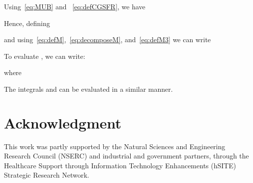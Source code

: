 \documentclass[10pt,twocolumn,twoside]{IEEEtran}
\newcommand{\corcol}[1]{\textcolor{CorCol}{#1}}
\begin{document}
\corcol{Using~\eqref{eq:MUB} and ~\eqref{eq:defCGSFR}, we have

Hence, defining

and using~\eqref{eq:defM},~\eqref{eq:decomposeM}, and~\eqref{eq:defM3} we can write

To evaluate , we can write:

where

The integrals  and  can be evaluated in a similar manner.} 



\section*{Acknowledgment}

This work was partly supported by the Natural Sciences and Engineering Research Council (NSERC) and industrial and government partners, through the Healthcare Support through Information Technology Enhancements (hSITE) Strategic Research Network.


\ifCLASSOPTIONcaptionsoff
  \newpage
\fi








\end{document}

